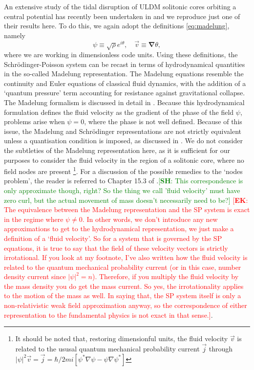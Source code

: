 \documentclass[a4paper,11pt]{article}
\newcommand{\ek}[1]{\textcolor{red}{[{\bf EK}: #1]}}
\newcommand{\sh}[1]{\textcolor{green}{[{\bf SH}: #1]}}
\begin{document}
An extensive study of the tidal disruption of ULDM solitonic cores orbiting a central potential has recently been undertaken in \cite{Du2018} and we reproduce just one of their results here. To do this, we again adopt the definitions \ref{eq:madelung}, namely
\begin{equation}\label{eq:madelung_repeated}
    \psi\equiv\sqrt{\rho}e^{i\theta}, \quad \vec{v}\equiv\boldsymbol{\nabla}\theta,
\end{equation}
where we are working in dimensionless code units. Using these definitions, the Schr{\"o}dinger-Poisson system can be recast in terms of hydrodynamical quantities in the so-called Madelung representation. The Madelung equations resemble the continuity and Euler equations of classical fluid dynamics, with the addition of a `quantum pressure' term accounting for resistance against gravitational collapse. The Madelung formalism is discussed in detail in \cite{Suarez2011, Suarez2015, Johnston2010, Kopp2017}. Because this hydrodynamical formulation defines the fluid velocity as the gradient of the phase of the field $\psi$, problems arise when $\psi=0$, where the phase is not well defined. Because of this issue, the Madelung and Schr{\"o}dinger representations are not strictly equivalent unless a quantisation condition is imposed, as discussed in \cite{Wallstrom1994}. We do not consider the subtleties of the Madelung representation here, as it is sufficient for our purposes to consider the fluid velocity in the region of a solitonic core, where no field nodes are present \footnote{It should be noted that, restoring dimensionful units, the fluid velocity $\vec{v}$ is related to the ususal quantum mechanical probability current $\vec{j}$ through $\vert\psi\vert^2\vec{v} = \vec{j} = \hbar/2mi\left[\psi^*\nabla\psi-\psi\nabla\psi^*\right]$}. For a discussion of the possible remedies to the `nodes problem', the reader is referred to Chapter 15.3 of \cite{Wyatt2005}.\sh{This correspondence is only approximate though, right? So the thing we call 'fluid velocity' must have zero curl, but the actual movement of mass doesn't necessarily need to be?} \ek{The equivalence between the Madelung representation and the SP system is exact in the regime where $\psi\neq 0$. In other words, we don't introduce any new approximations to get to the hydrodynamical representation, we just make a definition of a `fluid velocity'. So for a system that is governed by the SP equations, it is true to say that the field of these velocity vectors is strictly irrotational. If you look at my footnote, I've also written how the fluid velocity is related to the quantum mechanical probability current (or in this case, number density current since $\vert\psi\vert^2=n$). Therefore, if you multiply the fluid velocity by the mass density you do get the mass current. So yes, the irrotationality applies to the motion of the mass as well. In saying that, the SP system itself is only a non-relativistic weak field approximation anyway, so the correspondence of either representation to the fundamental physics is not exact in that sense.}. 
\end{document}
